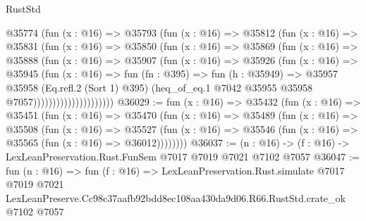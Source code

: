 \begin{lexlean}{RustStd}
\begin{coremodule}
                      @35774
                        (fun (x : @16) =>
                        @35793
                          (fun (x : @16) =>
                          @35812
                            (fun (x : @16) =>
                            @35831
                              (fun (x : @16) =>
                              @35850
                                (fun (x : @16) =>
                                @35869
                                  (fun (x : @16) =>
                                  @35888
                                    (fun (x : @16) =>
                                    @35907
                                      (fun (x : @16) =>
                                      @35926
                                        (fun (x : @16) =>
                                        @35945
                                          (fun (x : @16) =>
                                          fun (fn : @395) =>
                                          fun (h : @35949) =>
                                          @35957
                                            @35958
                                            (Eq.refl.{2} (Sort 1) @395)
                                            (heq_of_eq.{1}
                                              @7042
                                              @35955
                                              @35958
                                              @7057)))))))))))))))))))))
@36029 := fun (x : @16) =>
  @35432
    (fun (x : @16) =>
    @35451
      (fun (x : @16) =>
      @35470
        (fun (x : @16) =>
        @35489
          (fun (x : @16) =>
          @35508
            (fun (x : @16) =>
            @35527
              (fun (x : @16) => @35546 (fun (x : @16) => @35565 (fun (x : @16) => @36012))))))))
@36037 := (n : @16) -> (f : @16) -> LexLeanPreservation.Rust.FunSem @7017 @7019 @7021 @7102 @7057
@36047 := fun (n : @16) =>
  fun (f : @16) =>
  LexLeanPreservation.Rust.simulate
    @7017
    @7019
    @7021
    LexLeanPreserve.Cc98c37aafb92bdd8ec108aa430da9d06.R66.RustStd.crate_ok
    @7102
    @7057
\end{coremodule}
\end{lexlean}

